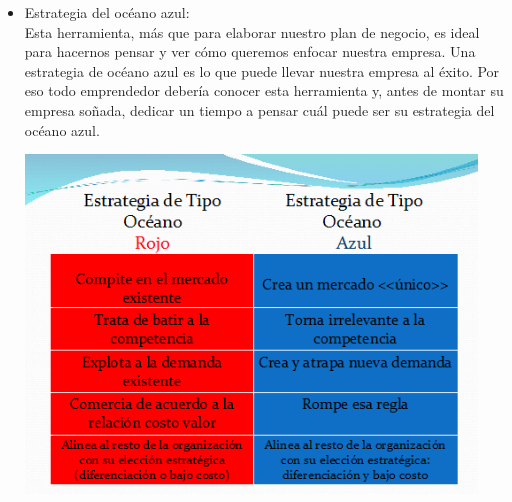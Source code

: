 	\begin{itemize}
\item Estrategia del océano azul:
\\Esta herramienta, más que para elaborar nuestro plan de negocio, es ideal para hacernos pensar y ver cómo queremos enfocar nuestra empresa. Una estrategia de océano azul es lo que puede llevar nuestra empresa al éxito. Por eso todo emprendedor debería conocer esta herramienta y, antes de montar su empresa soñada, dedicar un tiempo a pensar cuál puede ser su estrategia del océano azul.
		\begin{center}
		\includegraphics[width=12cm]{./Imagenes/Imagen6}
		\end{center}
	\end{itemize} 
	
